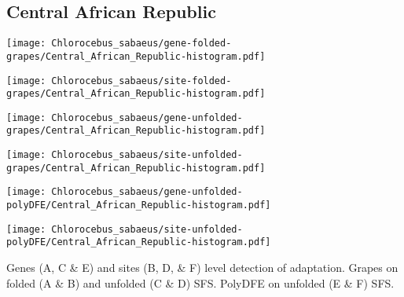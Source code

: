 \documentclass{article}
\begin{document}
\pagebreak
\subsection{Central African Republic}
\centering
\begin{minipage}{0.49\linewidth}
    \texttt{[image: Chlorocebus\_sabaeus/gene-folded-grapes/Central\_African\_Republic-histogram.pdf]}
\end{minipage}%
\hfill
\begin{minipage}{0.49\linewidth}
    \texttt{[image: Chlorocebus\_sabaeus/site-folded-grapes/Central\_African\_Republic-histogram.pdf]}
\end{minipage}
\hfill
\begin{minipage}{0.49\linewidth}
    \texttt{[image: Chlorocebus\_sabaeus/gene-unfolded-grapes/Central\_African\_Republic-histogram.pdf]}
\end{minipage}%
\hfill
\begin{minipage}{0.49\linewidth}
    \texttt{[image: Chlorocebus\_sabaeus/site-unfolded-grapes/Central\_African\_Republic-histogram.pdf]}
\end{minipage}
\hfill
\begin{minipage}{0.49\linewidth}
    \texttt{[image: Chlorocebus\_sabaeus/gene-unfolded-polyDFE/Central\_African\_Republic-histogram.pdf]}
\end{minipage}%
\hfill
\begin{minipage}{0.49\linewidth}
    \texttt{[image: Chlorocebus\_sabaeus/site-unfolded-polyDFE/Central\_African\_Republic-histogram.pdf]}
\end{minipage}
\hfill
\flushleft
Genes (A, C \& E) and sites (B, D, \& F) level detection of adaptation.
Grapes on folded (A \& B) and unfolded (C \& D) SFS.
PolyDFE on unfolded (E \& F) SFS.

\pagebreak
\end{document}
